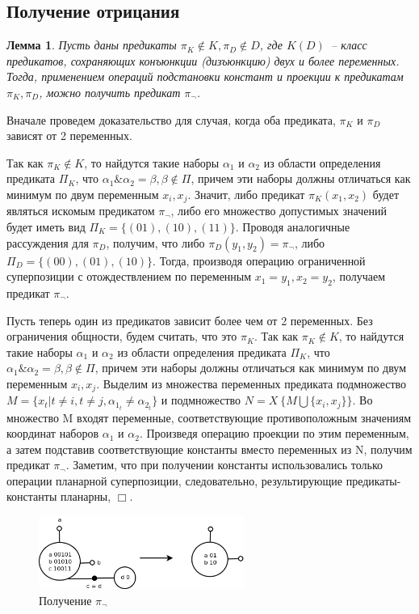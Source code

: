 \documentclass[12pt]{article}
\newtheorem{lemma}[theorem]{Лемма}
\newenvironment{proof}[1][Доказательство]{\begin{trivlist}
\item[\hskip \labelsep {\bfseries #1}]}{\end{trivlist}}
\begin{document}
\subsection{Получение отрицания}
\begin{lemma}
\label{eq:negate}
Пусть даны предикаты $\pi_K \notin K, \pi_D \notin D$, где $K (D)$~-- класс предикатов, 
сохраняющих конъюнкции (дизъюнкцию) двух и более переменных.
Тогда, применением операций подстановки констант и проекции
к предикатам $\pi_K, \pi_D$, можно получить предикат $\pi_{\neg}$.
\end{lemma}

\begin{proof}
Вначале проведем доказательство для случая, когда оба предиката, $\pi_K$ и $\pi_D$ зависят от 2 переменных.

Так как $\pi_K \notin K$, то найдутся такие наборы $\alpha_1$ и $\alpha_2$ из области определения предиката $\Pi_K$, что
$\alpha_1\&\alpha_2=\beta, \beta \notin \Pi$, причем эти наборы должны отличаться как минимум по двум переменным $x_i, x_{j}$.
Значит, либо предикат $\pi_K(x_1, x_2)$ будет являться искомым предикатом $\pi_{\neg}$, либо его множество
допустимых значений будет иметь вид $\Pi_K = \{ (01), (10), (11) \}$. 
Проводя аналогичные рассуждения для $\pi_D$, получим, что либо $\pi_D(y_1, y_2) = \pi_{\neg}$, либо $\Pi_D = \{ (00), (01), (10) \}$.
Тогда, производя операцию ограниченной суперпозиции с отождествлением по переменным $x_1=y_1, x_2=y_2$, получаем
предикат $\pi_{\neg}$.

Пусть теперь один из предикатов зависит более чем от 2 переменных. Без ограничения общности, будем считать, что это $\pi_K$.
Так как $\pi_K \notin K$, то найдутся такие наборы $\alpha_1$ и $\alpha_2$ из области определения предиката $\Pi_K$, что
$\alpha_1\&\alpha_2=\beta, \beta \notin \Pi$, причем эти наборы должны отличаться как минимум по двум переменным $x_i, x_{j}$.
Выделим из множества переменных предиката подмножество $M = \{ x_t | t \neq i, t \neq j, \alpha_{1_t} \neq \alpha_{2_t} \}$ и 
подмножество $N = X \ \{ M \bigcup \{x_i, x_j\} \}$.
Во множество M входят переменные, соответствующие противоположным значениям координат наборов $\alpha_1$ и $\alpha_2$.
Произведя операцию проекции по этим переменным, а затем подставив соответствующие
константы вместо переменных из N, получим предикат $\pi_{\neg}$.
Заметим, что при получении константы использовались только операции планарной суперпозиции, следовательно, 
результирующие предикаты-константы планарны, $\Box$.
\end{proof}
\begin{figure}[htb]
\centering
\includegraphics[width=0.6\textwidth]{negate.png}
\caption{Получение $\pi_{\neg}$}
\label{fig:negation}
\end{figure}
\end{document}
